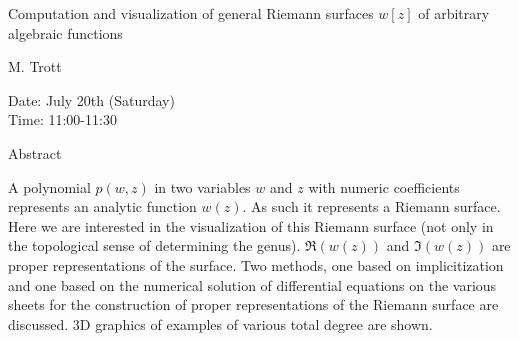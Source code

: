 \begin{center}
\LARGE
Computation and visualization of general Riemann surfaces
              $w[z]$ of arbitrary algebraic functions

\end{center}

\begin{center}
\Large
M. Trott

\end{center}

\noindent
Date:  July 20th (Saturday)\\
Time: 11:00-11:30\\

\begin{center}
\large
Abstract
\end{center}

A polynomial $p(w,z)$ in two variables $w$ and $z$ with numeric coefficients represents an
analytic function $w(z)$. As such it represents a Riemann surface. Here we are interested in the
visualization of this Riemann surface (not only in the topological sense of determining the genus).
$\Re(w(z))$ and $\Im(w(z))$ are proper representations of the surface. Two methods, one based on
implicitization and one based on the numerical solution of differential equations on the various
sheets for the construction of proper representations of the Riemann surface are discussed. 3D
graphics of examples of various total degree are shown. 

